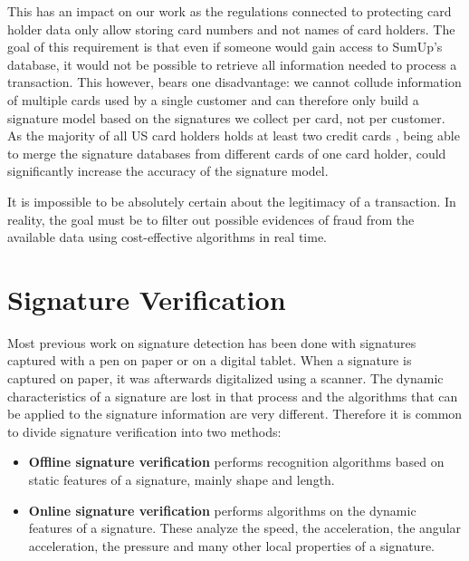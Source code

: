 \documentclass[a4paper, oneside]{csthesis}
\begin{document}
This has an impact on our work as the regulations connected to  protecting card holder data only allow storing card numbers and not names of card holders. The goal of this requirement is that even if someone would gain access to SumUp's database, it would not be possible to retrieve all information needed to process a transaction. This however, bears one disadvantage: we cannot collude information of multiple cards used by a single customer and can therefore only build a signature model based on the signatures we collect per card, not per customer. As the majority of all US card holders holds at least two credit cards \cite{woolsey2010credit}, being able to merge the signature databases from different cards of one card holder, could significantly increase the accuracy of the signature model.

It is impossible to be absolutely certain about the legitimacy of a transaction. In reality, the goal must be to filter out possible evidences of fraud from the available data using cost-effective algorithms in real time.








\section{Signature Verification}

Most previous work on signature detection has been done with signatures captured with a pen on paper or on a digital tablet. When a signature is captured on paper, it was afterwards digitalized using a scanner. The dynamic characteristics of a signature are lost in that process and the algorithms that can be applied to the signature information are very different. Therefore it is common to divide signature verification into two methods:

\begin{itemize}
\item \textbf{Offline signature verification} performs recognition algorithms based on static features of a signature, mainly shape and length.
\item \textbf{Online signature verification} performs algorithms on the dynamic features of a signature. These analyze the speed, the acceleration, the angular acceleration, the pressure and many other local properties of a signature.
\end{itemize}
\end{document}
